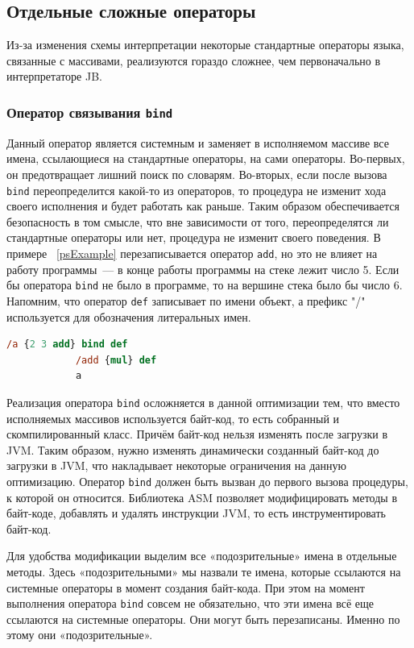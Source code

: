 	\subsection{Отдельные сложные операторы}
	Из-за изменения схемы интерпретации некоторые стандартные операторы языка, связанные с массивами, реализуются гораздо сложнее, чем первоначально в интерпретаторе JB. 
	\subsubsection*{Оператор связывания \texttt{bind}}
	Данный оператор является системным и заменяет в исполняемом массиве все имена, ссылающиеся на стандартные операторы, на сами операторы.	Во-первых, он предотвращает лишний поиск по словарям. Во-вторых, если после вызова \texttt{bind} переопределится какой-то из операторов, то процедура не изменит хода своего исполнения и будет работать как раньше. Таким образом обеспечивается безопасность в том смысле, что вне зависимости от того, переопределятся ли стандартные операторы или нет, процедура не изменит своего поведения. В примере ~\ref{psExample} перезаписывается оператор \texttt{add}, но это не влияет на работу программы~---  в конце работы программы на стеке лежит число 5. Если бы оператора \texttt{bind} не было в программе, то на вершине стека было бы число 6. Напомним, что оператор \texttt{def} записывает по имени объект, а префикс "/"\,  используется для обозначения литеральных имен.  
		\begin{lstlisting}[float, label=psExample,caption=пример на PostScript на оператор \texttt{bind},captionpos=b, frame = single, language = PostScript]
			/a {2 3 add} bind def
			/add {mul} def
			a
		\end{lstlisting}
	

	Реализация оператора \texttt{bind} осложняется в данной оптимизации тем, что вместо исполняемых массивов используется байт-код, то есть собранный и скомпилированный класс. Причём байт-код нельзя изменять после загрузки в JVM.  Таким образом,  нужно изменять динамически созданный байт-код до загрузки в JVM, что накладывает некоторые ограничения на данную оптимизацию. Оператор \texttt{bind} должен быть вызван до первого вызова процедуры, к которой он относится. Библиотека ASM позволяет модифицировать методы в байт-коде, добавлять и удалять инструкции JVM, то есть инструментировать байт-код. 
	
	Для удобства модификации выделим все «подозрительные» имена в отдельные методы. Здесь «подозрительными» мы назвали те имена, которые ссылаются на системные операторы в момент создания байт-кода. При этом на момент выполнения оператора \texttt{bind} совсем не обязательно, что эти имена всё еще ссылаются на системные операторы. Они могут быть перезаписаны. Именно по этому они «подозрительные».
	
